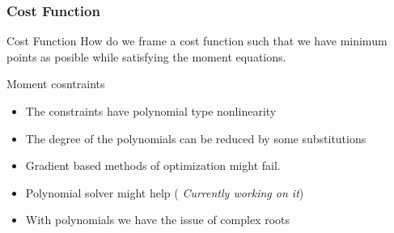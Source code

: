 \documentclass{beamer}
\begin{document}
\begin{frame}
\frametitle{Cost Function}
\begin{block}{Cost Function}
How do we frame a cost function such that we have minimum points as posible while satisfying the moment equations.
\end{block}
\begin{block}{Moment cosntraints}
\begin{itemize}[<+->]
\item The constraints have polynomial type nonlinearity 
\item The degree of the polynomials can be reduced by some substitutions
\item Gradient based methods of optimization might fail.
\item Polynomial solver might help ( \emph{Currently working on it})
\item With polynomials we have the issue of complex roots
\end{itemize}
\end{block}
\end{frame}
\end{document}
